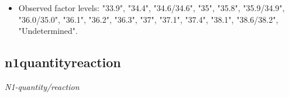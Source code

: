 \documentclass[]{article}
\providecommand{\tightlist}{%
  \setlength{\itemsep}{0pt}\setlength{\parskip}{0pt}}
\begin{document}
\begin{itemize}
\tightlist
\item
  Observed factor levels: "33.9", "34.4", "34.6/34.6", "35", "35.8",
  "35.9/34.9", "36.0/35.0", "36.1", "36.2", "36.3", "37", "37.1",
  "37.4", "38.1", "38.6/38.2", "Undetermined".
\end{itemize}

\noindent\makebox[\linewidth]{\rule{\textwidth}{0.4pt}}

\hypertarget{n1quantityreaction}{%
\subsection{n1quantityreaction}\label{n1quantityreaction}}

\emph{N1-quantity/reaction}

\begin{minipage}{0.75 \textwidth}


\end{minipage}
\end{document}

